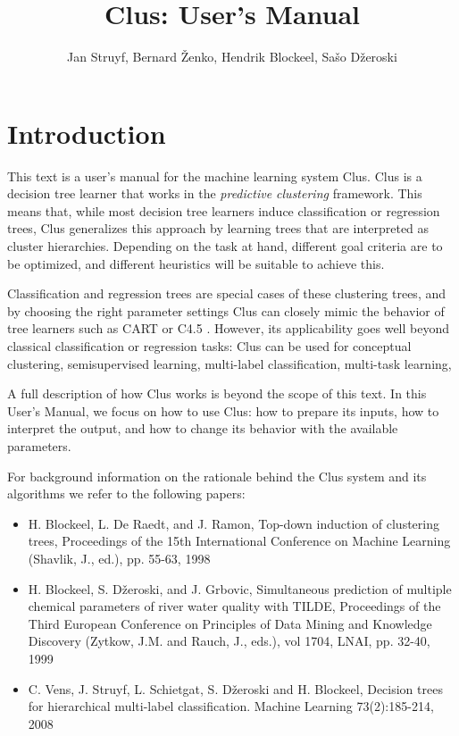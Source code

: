 \documentclass[a4paper]{report}
\begin{document}
\title{Clus: User's Manual}

\author{Jan Struyf, Bernard \v{Z}enko, Hendrik Blockeel, Sa\v{s}o D\v{z}eroski}

\maketitle



\tableofcontents



\chapter{Introduction}



This text is a user's manual for the machine learning system Clus.
Clus is a decision tree learner that works in the {\em predictive clustering} framework.
This means that, while most decision tree learners induce classification or regression trees,
Clus generalizes this approach by learning trees that are interpreted as cluster
hierarchies.  Depending on the task at hand, different goal criteria are to be optimized, and different heuristics will be suitable to achieve this.

Classification and regression trees are special cases of these clustering trees, and by choosing the right parameter settings Clus can closely mimic the behavior of tree learners such as CART \cite{Breiman84:other} or C4.5 \cite{Quinlan93:other}.  However, its applicability goes well beyond classical classification or regression tasks: Clus can be used for conceptual clustering, semisupervised learning, multi-label classification, multi-task learning, 

A full description of how Clus works is beyond the scope of this text.  In this User's Manual, we focus on how to use Clus: how to prepare its inputs, how to interpret the output, and how to change its behavior with the available parameters.

For background information on the rationale behind the Clus system and its algorithms we refer to the following papers:

\begin{itemize}

\item H. Blockeel, L. De Raedt, and J. Ramon, Top-down induction of clustering trees, Proceedings of the 15th International Conference on Machine Learning (Shavlik, J., ed.), pp. 55-63, 1998

\item H. Blockeel, S. D\v zeroski, and J. Grbovic, Simultaneous prediction of multiple chemical parameters of river water quality with TILDE, Proceedings of the Third European Conference on Principles of Data Mining and Knowledge Discovery (Zytkow, J.M. and Rauch, J., eds.), vol 1704, LNAI, pp. 32-40, 1999

\item  C. Vens, J. Struyf, L. Schietgat, S. D\v zeroski and H. Blockeel, Decision trees for hierarchical multi-label classification. Machine Learning 73(2):185-214, 2008

\end{itemize}
\end{document}
